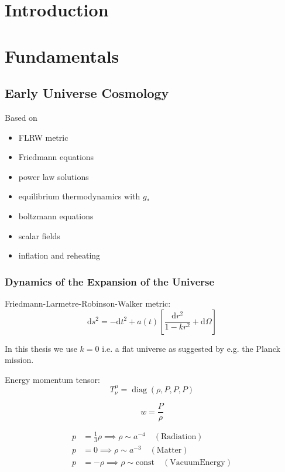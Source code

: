 \documentclass[master,       %
               twoside,        %
               BCOR10mm,       %
               english,ngerman, %
               ]{GAUBM}
\begin{document}
\begin{otherlanguage}{english}
\mainmatter   %

\chapter{Introduction}

\chapter{Fundamentals}

\section{Early Universe Cosmology}

Based on \cite{the_early_universe_kolb_and_turner}

\begin{itemize}
	\item FLRW metric
	\item Friedmann equations
	\item power law solutions
	\item equilibrium thermodynamics with $g_*$
	\item boltzmann equations
	\item scalar fields
	\item inflation and reheating
\end{itemize}

\subsection{Dynamics of the Expansion of the Universe}
Friedmann-Larmetre-Robinson-Walker metric:
\begin{equation}
	\mathrm{d} s^2 = - \mathrm{d} t^2 + a(t) \left[ \frac{\mathrm{d} r^2}{1 - kr^2} + \mathrm{d} \Omega \right]
\end{equation}

In this thesis we use $k = 0$ i.e. a flat universe as suggested by e.g. the Planck mission.

Energy momentum tensor:
\begin{equation}
	T_\nu^\mu = \operatorname{diag}(\rho, P, P, P)
\end{equation}

\begin{equation}
	w = \frac{P}{\rho}
\end{equation}

\begin{align}
	p &= \frac{1}{3} \rho \implies \rho \sim a^{-4} \quad \mathrm{(Radiation)} \nonumber \\
	p &= 0 \implies \rho \sim a^{-3} \quad \mathrm{(Matter)} \nonumber \\
	p &= - \rho \implies \rho \sim \mathrm{const} \quad \mathrm{(Vacuum Energy)}
\end{align}


\end{otherlanguage}
\end{document}
